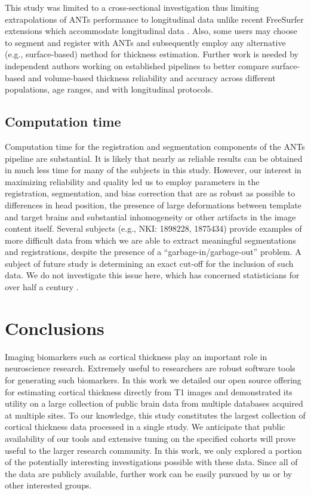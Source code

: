 This study was limited to a cross-sectional investigation thus limiting
extrapolations of ANTs performance to longitudinal data unlike
recent FreeSurfer extensions which accommodate longitudinal data \citep{reuter2012,jovicich2013}.  
Also, some users may choose to segment and register
with ANTs and subsequently employ any alternative (e.g., surface-based)
method for thickness estimation.  Further work is needed by
independent authors working on established pipelines 
to better compare surface-based and volume-based thickness reliability
and accuracy across different populations, age ranges, and with 
longitudinal protocols. 

\subsection{Computation time}
Computation time for the registration and segmentation components of
the ANTs pipeline are substantial.  It is likely that nearly as reliable
results can be obtained in much less time for many of the subjects in
this study.  However, our interest in
maximizing reliability and quality led us to employ parameters in the
registration, segmentation, and bias correction that are as robust as
possible to differences in head position, the presence of large
deformations between template and target brains and substantial
inhomogeneity or other artifacts in the image content itself.  Several
subjects (e.g., NKI: 1898228, 1875434) provide examples of more difficult
data from which we are able to
extract meaningful segmentations and registrations, despite the presence of a
``garbage-in/garbage-out'' problem.  A subject of future study is
determining an exact cut-off for the inclusion of such data.  We do not
investigate this issue here, which has concerned statisticians for over
half a century \cite{Hampel2001}. 

\section{Conclusions}

Imaging biomarkers such as cortical thickness play an 
important role in neuroscience research.  Extremely useful to
researchers are robust software tools for generating such 
biomarkers.  In this work we detailed our open source offering for estimating
cortical thickness directly from T1 images and demonstrated
its utility on a large collection of public brain data from
multiple databases acquired at multiple sites.  To our knowledge,
this study constitutes the largest collection of cortical
thickness data processed in a single study.  
We anticipate that public availability of our tools and extensive tuning on
the specified cohorts will prove useful to the larger
research community.   In this work, we only explored a portion of the potentially
interesting investigations possible with these data.
Since all of the data are publicly available, further work can
be easily pursued by us or by other interested groups.